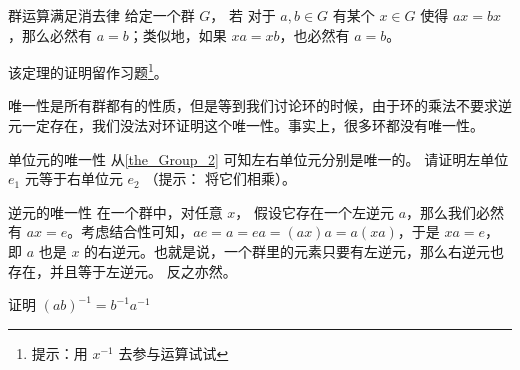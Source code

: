 \begin{theorem}{群运算满足消去律}\label{the_Group_2}
给定一个群 $G$， 若 对于 $ a, b\in G$ 有某个 $x\in G$ 使得 $ax=bx$，那么必然有 $a=b$；类似地，如果 $xa=xb$，也必然有 $a=b$。
\end{theorem}

该定理的证明留作习题\footnote{提示：用 $x^{-1}$ 去参与运算试试}。

唯一性是所有群都有的性质，但是等到我们讨论环的时候，由于环的乘法不要求逆元一定存在，我们没法对环证明这个唯一性。事实上，很多环都没有唯一性。

\begin{exercise}{单位元的唯一性}
从\autoref{the_Group_2} 可知左右单位元分别是唯一的。 请证明左单位 $e_1$ 元等于右单位元 $e_2$ （提示： 将它们相乘）。
\end{exercise}

\begin{theorem}{逆元的唯一性}\label{the_Group_1}
在一个群中，对任意 $x$， 假设它存在一个左逆元 $a$，那么我们必然有 $ax=e$。考虑结合性可知，$ae=a=ea=(ax)a=a(xa)$，于是 $xa=e$，即 $a$ 也是 $x$ 的右逆元。也就是说，一个群里的元素只要有左逆元，那么右逆元也存在，并且等于左逆元。 反之亦然。
\end{theorem}

\begin{exercise}{}
证明 $(ab)^{-1} = b^{-1}a^{-1}$
\end{exercise}
